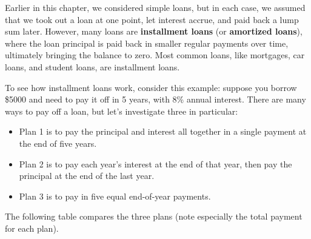 \setcounter{ExampleCounter}{1}
Earlier in this chapter, we considered simple loans, but in each case, we assumed that we took out a loan at one point, let interest accrue, and paid back a lump sum later.  However, many loans are \textbf{installment loans} (or \textbf{amortized loans}), where the loan principal is paid back in smaller regular payments over time, ultimately bringing the balance to zero.  Most common loans, like mortgages, car loans, and student loans, are installment loans.

To see how installment loans work, consider this example: suppose you borrow \$5000 and need to pay it off in 5 years, with 8\% annual interest.  There are many ways to pay off a loan, but let's investigate three in particular:
\begin{itemize}
\item Plan 1 is to pay the principal and interest all together in a single payment at the end of five years.
\item Plan 2 is to pay each year's interest at the end of that year, then pay the principal at the end of the last year.
\item Plan 3 is to pay in five equal end-of-year payments.
\end{itemize}
The following table compares the three plans (note especially the total payment for each plan).
